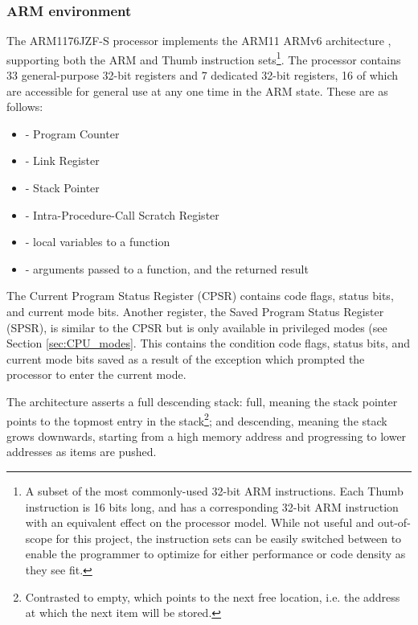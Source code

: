     \subsubsection{ARM environment}
        \label{sec:ARMenv}
        The ARM1176JZF-S processor implements the ARM11 ARMv6 architecture
        \cite{TRM}, supporting both the ARM and Thumb instruction sets\footnote{A
        subset of the most commonly-used 32-bit ARM instructions.  Each Thumb
        instruction is 16 bits long, and has a corresponding 32-bit ARM
        instruction with an equivalent effect on the processor model. While not
        useful and out-of-scope for this project, the instruction sets can be
        easily switched between to enable the programmer to optimize for either
        performance or code density as they see fit.}. The processor contains 33
        general-purpose 32-bit registers and 7 dedicated 32-bit registers, 16 of
        which are accessible for general use at any one time in the ARM state.
        These are as follows:
        \begin{itemize}
            \itemsep0em
            \item {} - Program Counter
            \item {} - Link Register
            \item {} - Stack Pointer
            \item {} - Intra-Procedure-Call Scratch Register
            \item {} - local variables to a function
            \item {} - arguments passed to a function, and the returned
                result
        \end{itemize}

        The Current Program Status Register (CPSR) contains code flags, status
        bits, and current mode bits.  Another register, the Saved Program Status
        Register (SPSR), is similar to the CPSR but is only available in
        privileged modes (see Section \ref{sec:CPU_modes}. This contains the
        condition code flags, status bits, and current mode bits saved as a
        result of the exception which prompted the processor to enter the
        current mode.

        The architecture asserts a full descending stack: full, meaning the
        stack pointer points to the topmost entry in the
        stack\footnote{Contrasted to empty, which points to the next free
        location, i.e. the address at which the next item will be stored.}; and
        descending, meaning the stack grows downwards, starting from a high
        memory address and progressing to lower addresses as items are pushed.


